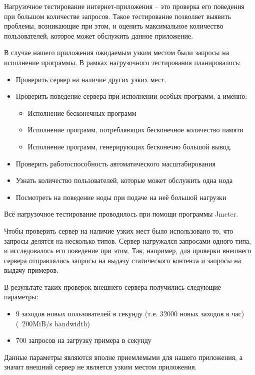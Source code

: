 	Нагрузочное тестирование интернет-приложения -- это проверка его поведения при большом количестве запросов. Такое тестирование позволяет выявить проблемы, возникающие при этом, и оценить максимальное количество пользователей, которое может обслужить данное приложение.
	
	В случае нашего приложения ожидаемым узким местом были запросы на исполнение программы. В рамках нагрузочного тестирования планировалось: 
\begin{itemize}
\item Проверить сервер на наличие других узких мест.
\item Проверить поведение сервера при исполнении особых программ, а именно:
	\begin{itemize}
		\item Исполнение бесконечных программ
		\item Исполнение программ, потребляющих бесконечное количество памяти
		\item Исполнение программ, генерирующих бесконечно большой вывод.
	\end{itemize}
\item Проверить работоспособность автоматического масштабирования
\item Узнать количество пользователей, которые может обслужить одна нода
\item Посмотреть на поведение ноды при подаче на неё большой нагрузки
\end{itemize}

	Всё нагрузочное тестирование проводилось при помощи программы Jmeter.

	Чтобы проверить сервер на наличие узких мест было использовано то, что запросы делятся на несколько типов. Сервер нагружался запросами одного типа, и исследовалось его поведение при этом. Так, например, для проверки внешнего сервера отправлялись запросы на выдачу статического контента и запросы на выдачу примеров.
	
	В результате таких проверок внешнего сервера получились следующие параметры:
\begin{itemize}
	\item 9 заходов новых пользователей в секунду (т.е. 32000 новых заходов в час) (~200MiB/s bandwidth)
	\item 700 запросов на загрузку примера в секунду
\end{itemize}
	Данные параметры являются вполне приемлемыми для нашего приложения, а значит внешний сервер не является узким местом приложения. 
	
